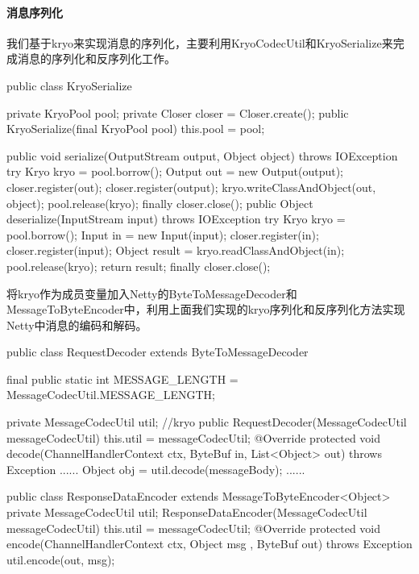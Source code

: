 \documentclass[a4paper]{article}
\theoremstyle{definition}
\begin{document}
\paragraph{消息序列化}
我们基于kryo来实现消息的序列化，主要利用KryoCodecUtil和KryoSerialize来完成消息的序列化和反序列化工作。
\begin{scala}
 public class KryoSerialize {
    private KryoPool pool;
    private Closer closer = Closer.create();
    public KryoSerialize(final KryoPool pool) {
        this.pool = pool;
    }

    public void serialize(OutputStream output, Object object) throws IOException {
        try {
            Kryo kryo = pool.borrow();
            Output out = new Output(output);
            closer.register(out);
            closer.register(output);
            kryo.writeClassAndObject(out, object);
            pool.release(kryo);
        } finally {
            closer.close();
        }
    }
    public Object deserialize(InputStream input) throws IOException {
        try {
            Kryo kryo = pool.borrow();
            Input in = new Input(input);
            closer.register(in);
            closer.register(input);
            Object result = kryo.readClassAndObject(in);
            pool.release(kryo);
            return result;
        } finally {
            closer.close();
        }
    }
}
\end{scala}
将kryo作为成员变量加入Netty的ByteToMessageDecoder和MessageToByteEncoder中，利用上面我们实现的kryo序列化和反序列化方法实现Netty中消息的编码和解码。
\begin{scala}
 public class RequestDecoder extends ByteToMessageDecoder {
    final public static int MESSAGE_LENGTH = MessageCodecUtil.MESSAGE_LENGTH;
  
    private MessageCodecUtil util; //kryo
    public RequestDecoder(MessageCodecUtil messageCodecUtil) {
        this.util = messageCodecUtil;
    }
    @Override
    protected void decode(ChannelHandlerContext ctx,
                          ByteBuf in, List<Object> out) throws Exception {
      	......
        Object obj = util.decode(messageBody);
      	......
     }
}
\end{scala}

\begin{scala}
 public class ResponseDataEncoder extends MessageToByteEncoder<Object> {
    private MessageCodecUtil util;
    ResponseDataEncoder(MessageCodecUtil messageCodecUtil) {
        this.util = messageCodecUtil;
    }
    @Override
    protected void encode(ChannelHandlerContext ctx, Object msg
                          , ByteBuf out) throws Exception {
        util.encode(out, msg);
    }
}
\end{scala}
\end{document}
